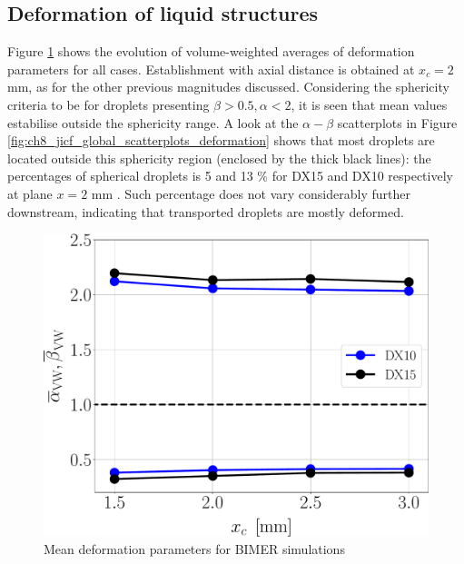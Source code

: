 \vspace*{-0.20in}


\subsection{Deformation of liquid structures}
\label{subsec:ch8_def_liquid_structures}

Figure \ref{fig:ch8_jicf_liquid_mean_deformation_with_x_condensed} shows the evolution of volume-weighted averages of deformation parameters for all cases. Establishment with axial distance is obtained at $x_c = 2$ mm, as for the other previous magnitudes discussed. Considering the sphericity criteria to be for droplets presenting $\beta > 0.5, \alpha < 2$, it is seen that mean values estabilise outside the sphericity range. A look at the $\alpha-\beta$ scatterplots in Figure \ref{fig:ch8_jicf_global_scatterplots_deformation} shows that most droplets are located outside this sphericity region (enclosed by the thick black lines): the percentages of spherical droplets is 5 and 13 $\%$ for DX15 and DX10 respectively at plane $x = 2$ mm . Such percentage does not vary considerably further downstream, indicating that transported droplets are mostly deformed. 

\clearpage

\begin{figure}[ht]
\centering
   \includegraphics[scale=0.25]{./part3_applications/figures_ch8_resolved/SPRAY_characterization/deformation/deformation_both_alpha_beta_mean}
   \caption{Mean deformation parameters for BIMER simulations}
\label{fig:ch8_jicf_liquid_mean_deformation_with_x_condensed}
\end{figure}


